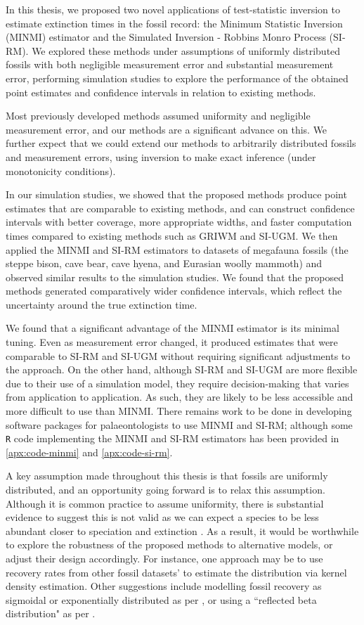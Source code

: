 
In this thesis, we proposed two novel applications of test-statistic inversion to estimate extinction times in the fossil record: the Minimum Statistic Inversion (MINMI) estimator and the Simulated Inversion - Robbins Monro Process (SI-RM). We explored these methods under assumptions of uniformly distributed fossils with both negligible measurement error and substantial measurement error, performing simulation studies to explore the performance of the obtained point estimates and confidence intervals in relation to existing methods.

Most previously developed methods assumed uniformity and negligible measurement error, and our methods are a significant advance on this. We further expect that we could extend our methods to arbitrarily distributed fossils and measurement errors, using inversion to make exact inference (under monotonicity conditions).

In our simulation studies, we showed that the proposed methods produce point estimates that are comparable to existing methods, and can construct confidence intervals with better coverage, more appropriate widths, and faster computation times compared to existing methods such as GRIWM and SI-UGM. We then applied the MINMI and SI-RM estimators to datasets of megafauna fossils (the steppe bison, cave bear, cave hyena, and Eurasian woolly mammoth) and observed similar results to the simulation studies. We found that the proposed methods generated comparatively wider confidence intervals, which reflect the uncertainty around the true extinction time.

We found that a significant advantage of the MINMI estimator is its minimal tuning. Even as measurement error changed, it produced estimates that were comparable to SI-RM and SI-UGM without requiring significant adjustments to the approach. On the other hand, although SI-RM and SI-UGM are more flexible due to their use of a simulation model, they require decision-making that varies from application to application. As such, they are likely to be less accessible and more difficult to use than MINMI. There remains work to be done in developing software packages for palaeontologists to use MINMI and SI-RM; although some \texttt{R} code implementing the MINMI and SI-RM estimators has been provided in \autoref{apx:code-minmi} and \autoref{apx:code-si-rm}.

A key assumption made throughout this thesis is that fossils are uniformly distributed, and an opportunity going forward is to relax this assumption. Although it is common practice to assume uniformity, there is substantial evidence to suggest this is not valid as we can expect a species to be less abundant closer to speciation and extinction \cite{Lee2010, WangMarshall2016}. As a result, it would be worthwhile to explore the robustness of the proposed methods to alternative models, or adjust their design accordingly. For instance, one approach may be to use recovery rates from other fossil datasets' to estimate the distribution via kernel density estimation. Other suggestions include modelling fossil recovery as sigmoidal or exponentially distributed as per \citet{Bradshaw2012}, or using a ``reflected beta distribution" as per \citet{Wang2016}.

